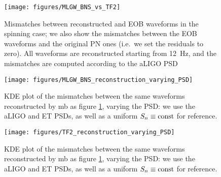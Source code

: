 \documentclass[main.tex]{subfiles}
\begin{document}
\cite[]{lindblomModelWaveformAccuracy2008}

\begin{figure}[ht]
\centering
\texttt{[image: figures/MLGW\_BNS\_vs\_TF2]}
\caption{Mismatches between reconstructed and \ac{EOB} waveforms in the spinning case; we also show the mismatches between the \ac{EOB} waveforms and the original \ac{PN} ones (i.e.\ we set the residuals to zero). All waveforms are reconstructed starting from \SI{12}{Hz}, and the mismatches are computed according to the \ac{aLIGO} \ac{PSD}}
\label{fig:MLGW_BNS_vs_TF2}
\end{figure}

\begin{figure}[ht]
\centering
\texttt{[image: figures/MLGW\_BNS\_reconstruction\_varying\_PSD]}
\caption{\ac{KDE} plot of the mismatches between the same waveforms reconstructed by \ac{mb} as figure \ref{fig:MLGW_BNS_vs_TF2}, varying the \ac{PSD}: we use the \ac{aLIGO} and \ac{ET} \acp{PSD}, as well as a uniform \(S_n \equiv \text{const}\) for reference. }
\label{fig:MLGW_BNS_reconstruction_varying_PSD}
\end{figure}

\begin{figure}[ht]
\centering
\texttt{[image: figures/TF2\_reconstruction\_varying\_PSD]}
\caption{\ac{KDE} plot of the mismatches between the same waveforms reconstructed by \ac{mb} as figure \ref{fig:MLGW_BNS_vs_TF2}, varying the \ac{PSD}: we use the \ac{aLIGO} and \ac{ET} \acp{PSD}, as well as a uniform \(S_n \equiv \text{const}\) for reference. }
\label{fig:TF2_reconstruction_varying_PSD}
\end{figure}
\end{document}
